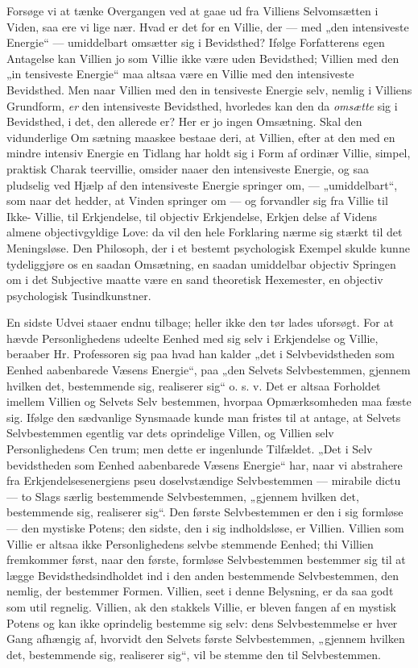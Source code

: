 \documentclass[12pt]{book}
\newcommand{\opage}[1]{\marginnote{\footnotesize\textit{[#1]}}}
\begin{document}
Forsøge vi at tænke Overgangen ved at gaae ud
fra Villiens Selvomsætten i Viden, saa ere vi lige nær.
Hvad er det for en Villie, der --- med „den intensiveste
Energie“ --- umiddelbart omsætter sig i Bevidsthed?
Ifølge Forfatterens egen Antagelse kan Villien jo som
Villie ikke være uden Bevidsthed; Villien med den „in\-%
tensiveste Energie“ maa altsaa være en Villie med den
\opage{42}\setcounter{footnote}{0}%
intensiveste Bevidsthed. Men naar Villien med den in\-%
tensiveste Energie selv, nemlig i Villiens Grundform,
\emph{er} den intensiveste Bevidsthed, hvorledes kan den da
\emph{omsætte} sig i Bevidsthed, i det, den allerede er?
Her er jo ingen Omsætning. Skal den vidunderlige Om\-%
sætning maaskee bestaae deri, at Villien, efter at den
med en mindre intensiv Energie en Tidlang har holdt
sig i Form af ordinær Villie, simpel, praktisk Charak\-%
teervillie, omsider naaer den intensiveste Energie, og saa
pludselig ved Hjælp af den intensiveste Energie springer
om, --- „umiddelbart“, som naar det hedder, at Vinden
springer om --- og forvandler sig fra Villie til Ikke-%
Villie, til Erkjendelse, til objectiv Erkjendelse, Erkjen\-%
delse af Videns almene objectivgyldige Love: da vil den
hele Forklaring nærme sig stærkt til det Meningsløse.
Den Philosoph, der i et bestemt psychologisk Exempel
skulde kunne tydeliggjøre os en saadan Omsætning, en
saadan umiddelbar objectiv Springen om i det Subjective
maatte være en sand theoretisk Hexemester, en objectiv
psychologisk Tusindkunstner.

En sidste Udvei staaer endnu tilbage; heller ikke
den tør lades uforsøgt. For at hævde Personlighedens
udeelte Eenhed med sig selv i Erkjendelse og Villie,
beraaber Hr. Professoren sig paa hvad han kalder „det
i Selvbevidstheden som Eenhed aabenbarede Væsens
Energie“, paa „den Selvets Selvbestemmen, gjennem
hvilken det, bestemmende sig, realiserer sig“ o. s. v.
Det er altsaa Forholdet imellem Villien og Selvets Selv\-%
bestemmen, hvorpaa Opmærksomheden maa fæste sig.
Ifølge den sædvanlige Synsmaade kunde man fristes til
at antage, at Selvets Selvbestemmen egentlig var dets
oprindelige Villen, og Villien selv Personlighedens Cen\-%
trum; men dette er ingenlunde Tilfældet. „Det i Selv\-%
bevidstheden som Eenhed aabenbarede Væsens Energie“
\opage{43}\setcounter{footnote}{0}%
har, naar vi abstrahere fra Erkjendelsesenergiens pseu\-%
doselvstændige Selvbestemmen --- mirabile dictu --- to
Slags særlig bestemmende Selvbestemmen, „gjennem
hvilken det, bestemmende sig, realiserer sig“. Den første
Selvbestemmen er den i sig formløse --- den mystiske
Potens; den sidste, den i sig indholdsløse, er Villien.
Villien som Villie er altsaa ikke Personlighedens selvbe\-%
stemmende Eenhed; thi Villien fremkommer først, naar
den første, formløse Selvbestemmen bestemmer sig til at
lægge Bevidsthedsindholdet ind i den anden bestemmende
Selvbestemmen, den nemlig, der bestemmer Formen.
Villien, seet i denne Belysning, er da saa godt som util\-%
regnelig. Villien, ak den stakkels Villie, er bleven fangen
af en mystisk Potens og kan ikke oprindelig bestemme
sig selv: dens Selvbestemmelse er hver Gang afhængig
af, hvorvidt den Selvets første Selvbestemmen, „gjennem
hvilken det, bestemmende sig, realiserer sig“, vil be\-%
stemme den til Selvbestemmen.
\end{document}
